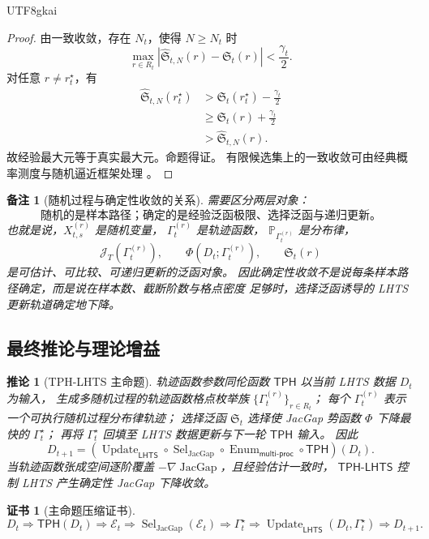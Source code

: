 \documentclass[12pt]{article}
\newtheorem{corollary}{推论}[section]
\newtheorem{remark}{备注}[section]
\newtheorem{Certificate}{证书}[section]
\newcommand{\LHTS}{\ensuremath{\mathsf{LHTS}}}
\newcommand{\TPH}{\ensuremath{\mathsf{TPH}}}
\newcommand{\TPHLHTS}{\ensuremath{\mathsf{TPH\mbox{-}LHTS}}}
\newcommand{\Prob}{\mathbb P}
\DeclareMathOperator{\JacGap}{JacGap}
\DeclareMathOperator{\Sel}{Sel}
\DeclareMathOperator{\Update}{Update}
\DeclareMathOperator{\Enum}{Enum}
\begin{document}
\begin{CJK*}{UTF8}{gkai}
\begin{proof}
由一致收敛，存在 \(N_t\)，使得 \(N\ge N_t\) 时
\[
\max_{r\in R_t}
\left|
\widehat{\mathfrak S}_{t,N}(r)-\mathfrak S_t(r)
\right|
<\frac{\gamma_t}{2}.
\]
对任意 \(r\ne r_t^\star\)，有
\[
\begin{aligned}
\widehat{\mathfrak S}_{t,N}(r_t^\star)
&>
\mathfrak S_t(r_t^\star)-\frac{\gamma_t}{2}\\
&\ge
\mathfrak S_t(r)+\frac{\gamma_t}{2}\\
&>
\widehat{\mathfrak S}_{t,N}(r).
\end{aligned}
\]
故经验最大元等于真实最大元。命题得证。
有限候选集上的一致收敛可由经典概率测度与随机逼近框架处理
\cite{Billingsley1995Probability,KushnerYin2003StochasticApproximation,Borkar2008StochasticApproximation}。
\end{proof}

\begin{remark}[随机过程与确定性收敛的关系]
需要区分两层对象：
\[
\boxed{
\text{随机的是样本路径；确定的是经验泛函极限、选择泛函与递归更新。}
}
\]
也就是说，\(X_{t,s}^{(r)}\) 是随机变量，
\(\Gamma_t^{(r)}\) 是轨迹函数，
\(\Prob_{\Gamma_t^{(r)}}\) 是分布律，
\[
\mathcal J_T(\Gamma_t^{(r)}),
\qquad
\Phi(D_t;\Gamma_t^{(r)}),
\qquad
\mathfrak S_t(r)
\]
是可估计、可比较、可递归更新的泛函对象。
因此确定性收敛不是说每条样本路径确定，而是说在样本数、截断阶数与格点密度
足够时，选择泛函诱导的 LHTS 更新轨道确定地下降。
\end{remark}

\subsection{最终推论与理论增益}
\label{subsec:tph-lhts-final-corollary}

\begin{corollary}[TPH-LHTS 主命题]
轨迹函数参数同伦函数 \(\TPH\) 以当前 LHTS 数据 \(D_t\) 为输入，
生成多随机过程的轨迹函数格点枚举族
\(\{\Gamma_t^{(r)}\}_{r\in R_t}\)；
每个 \(\Gamma_t^{(r)}\) 表示一个可执行随机过程分布律轨迹；
选择泛函 \(\mathfrak S_t\) 选择使 JacGap 势函数 \(\Phi\) 下降最快的
\(\Gamma_t^\star\)；
再将 \(\Gamma_t^\star\) 回填至 LHTS 数据更新与下一轮 \(\TPH\) 输入。
因此
\[
\boxed{
D_{t+1}
=
\left(
\Update_{\LHTS}
\circ
\Sel_{\JacGap}
\circ
\Enum_{\mathsf{multi\mbox{-}proc}}
\circ
\TPH
\right)(D_t).
}
\]
当轨迹函数张成空间逐阶覆盖 \(-\nabla\JacGap\)，且经验估计一致时，
\(\TPHLHTS\) 控制 LHTS 产生确定性 JacGap 下降收敛。
\end{corollary}

\begin{Certificate}[主命题压缩证书]
\[
\boxed{
D_t
\Rightarrow
\TPH(D_t)
\Rightarrow
\mathcal E_t
\Rightarrow
\Sel_{\JacGap}(\mathcal E_t)
\Rightarrow
\Gamma_t^\star
\Rightarrow
\Update_{\LHTS}(D_t,\Gamma_t^\star)
\Rightarrow
D_{t+1}.
}
\]
\end{Certificate}


\end{CJK*}
\end{document}
